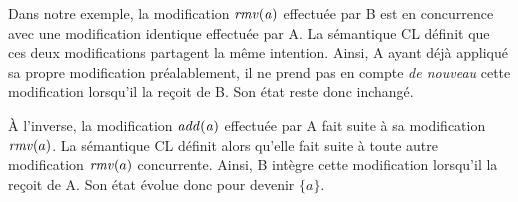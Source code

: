 Dans notre exemple, la modification $\mathit{rmv(a)}$ effectuée par B est en concurrence avec une modification identique effectuée par A.
La sémantique \ac{CL} définit que ces deux modifications partagent la même intention.
Ainsi, A ayant déjà appliqué sa propre modification préalablement, il ne prend pas en compte \emph{de nouveau} cette modification lorsqu'il la reçoit de B.
Son état reste donc inchangé.

À l'inverse, la modification $\mathit{add(a)}$ effectuée par A fait suite à sa modification $\mathit{rmv}(a)$.
La sémantique \ac{CL} définit alors qu'elle fait suite à toute autre modification $\mathit{rmv}(a)$ concurrente.
Ainsi, B intègre cette modification lorsqu'il la reçoit de A.
Son état évolue donc pour devenir $\{a\}$.
